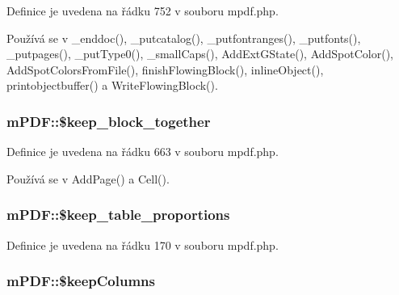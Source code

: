 Definice je uvedena na řádku 752 v souboru mpdf.\-php.



Používá se v \-\_\-enddoc(), \-\_\-putcatalog(), \-\_\-putfontranges(), \-\_\-putfonts(), \-\_\-putpages(), \-\_\-put\-Type0(), \-\_\-small\-Caps(), Add\-Ext\-G\-State(), Add\-Spot\-Color(), Add\-Spot\-Colors\-From\-File(), finish\-Flowing\-Block(), inline\-Object(), printobjectbuffer() a Write\-Flowing\-Block().

\hypertarget{classm_p_d_f_a106a7ef02b2faf856724e2284b7a20c3}{
\subsubsection[{\$keep\-\_\-block\-\_\-together}]{\setlength{\rightskip}{0pt plus 5cm}m\-P\-D\-F\-::\$keep\-\_\-block\-\_\-together}}\label{classm_p_d_f_a106a7ef02b2faf856724e2284b7a20c3}


Definice je uvedena na řádku 663 v souboru mpdf.\-php.



Používá se v Add\-Page() a Cell().

\hypertarget{classm_p_d_f_a08004c9ce33e1ca6f55e5ebfbeb74586}{
\subsubsection[{\$keep\-\_\-table\-\_\-proportions}]{\setlength{\rightskip}{0pt plus 5cm}m\-P\-D\-F\-::\$keep\-\_\-table\-\_\-proportions}}\label{classm_p_d_f_a08004c9ce33e1ca6f55e5ebfbeb74586}


Definice je uvedena na řádku 170 v souboru mpdf.\-php.

\hypertarget{classm_p_d_f_ae46f528caa6c0f23c7d8213880c8bc9d}{
\subsubsection[{\$keep\-Columns}]{\setlength{\rightskip}{0pt plus 5cm}m\-P\-D\-F\-::\$keep\-Columns}}\label{classm_p_d_f_ae46f528caa6c0f23c7d8213880c8bc9d}


